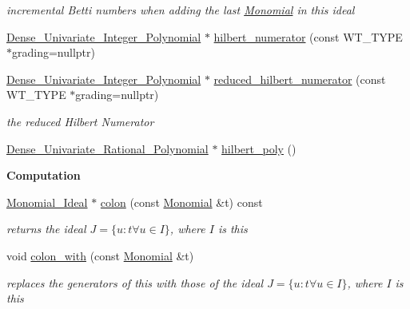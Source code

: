 \begin{Indent}
\begin{DoxyCompactItemize}
\begin{DoxyCompactList}\small\item\em incremental Betti numbers when adding the last \hyperlink{group__polygroup_class_monomial}{Monomial} in this ideal \end{DoxyCompactList}\item 
\hyperlink{group__polygroup_class_dense___univariate___integer___polynomial}{Dense\+\_\+\+Univariate\+\_\+\+Integer\+\_\+\+Polynomial} $\ast$ \hyperlink{group__polygroup_a4baf5da74da622fa61e048552e873733}{hilbert\+\_\+numerator} (const W\+T\+\_\+\+T\+Y\+PE $\ast$grading=nullptr)
\item 
\hyperlink{group__polygroup_class_dense___univariate___integer___polynomial}{Dense\+\_\+\+Univariate\+\_\+\+Integer\+\_\+\+Polynomial} $\ast$ \hyperlink{group__polygroup_a814e71b7c8df465869708bbcdf8f6007}{reduced\+\_\+hilbert\+\_\+numerator} (const W\+T\+\_\+\+T\+Y\+PE $\ast$grading=nullptr)
\begin{DoxyCompactList}\small\item\em the reduced Hilbert Numerator \end{DoxyCompactList}\item 
\hyperlink{group__polygroup_class_dense___univariate___rational___polynomial}{Dense\+\_\+\+Univariate\+\_\+\+Rational\+\_\+\+Polynomial} $\ast$ \hyperlink{group__polygroup_a2f5e73c22e492ea016a4c7ff117cc7a3}{hilbert\+\_\+poly} ()
\end{DoxyCompactItemize}
\end{Indent}
\begin{Indent}\textbf{ Computation}\par
\begin{DoxyCompactItemize}
\item 
\hyperlink{group__polygroup_class_monomial___ideal}{Monomial\+\_\+\+Ideal} $\ast$ \hyperlink{group__polygroup_a708f7bc64b3e5d5ac3ea8e3b0cb15769}{colon} (const \hyperlink{group__polygroup_class_monomial}{Monomial} \&t) const
\begin{DoxyCompactList}\small\item\em returns the ideal $J=\{u:t \forall u\in I\}$, where $I$ is {\ttfamily this} \end{DoxyCompactList}\item 
void \hyperlink{group__polygroup_a2ae67955874f0a461952a89f6fb25647}{colon\+\_\+with} (const \hyperlink{group__polygroup_class_monomial}{Monomial} \&t)
\begin{DoxyCompactList}\small\item\em replaces the generators of {\ttfamily this} with those of the ideal $J=\{u:t \forall u\in I\}$, where $I$ is {\ttfamily this} \end{DoxyCompactList}\end{DoxyCompactItemize}
\end{Indent}
